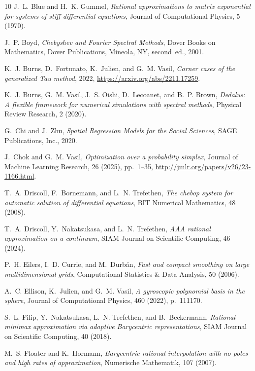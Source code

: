 \documentclass{article}
\begin{document}
\begin{thebibliography}{10}
{\sc J.~L. Blue and H.~K. Gummel}, {\em Rational approximations to matrix exponential for systems of stiff differential equations}, Journal of Computational Physics, 5 (1970).

{\sc J.~P. Boyd}, {\em Chebyshev and Fourier Spectral Methods}, Dover Books on Mathematics, Dover Publications, Mineola, NY, second~ed., 2001.

{\sc K.~J. Burns, D.~Fortunato, K.~Julien, and G.~M. Vasil}, {\em Corner cases of the generalized {T}au method}, 2022, \url{https://arxiv.org/abs/2211.17259}.

{\sc K.~J. Burns, G.~M. Vasil, J.~S. Oishi, D.~Lecoanet, and B.~P. Brown}, {\em Dedalus: A flexible framework for numerical simulations with spectral methods}, Physical Review Research, 2 (2020).

{\sc G.~Chi and J.~Zhu}, {\em Spatial Regression Models for the Social Sciences}, {SAGE} Publications, Inc., 2020.

{\sc J.~Chok and G.~M. Vasil}, {\em Optimization over a probability simplex}, Journal of Machine Learning Research, 26 (2025), pp.~1--35, \url{http://jmlr.org/papers/v26/23-1166.html}.

{\sc T.~A. Driscoll, F.~Bornemann, and L.~N. Trefethen}, {\em The chebop system for automatic solution of differential equations}, {BIT} Numerical Mathematics, 48 (2008).

{\sc T.~A. Driscoll, Y.~Nakatsukasa, and L.~N. Trefethen}, {\em {AAA} rational approximation on a continuum}, SIAM Journal on Scientific Computing, 46 (2024).

{\sc P.~H. Eilers, I.~D. Currie, and M.~Durb{\'{a}}n}, {\em Fast and compact smoothing on large multidimensional grids}, Computational Statistics \& Data Analysis, 50 (2006).

{\sc A.~C. Ellison, K.~Julien, and G.~M. Vasil}, {\em A gyroscopic polynomial basis in the sphere}, Journal of Computational Physics, 460 (2022), p.~111170.

{\sc S.~L. Filip, Y.~Nakatsukasa, L.~N. Trefethen, and B.~Beckermann}, {\em Rational minimax approximation via adaptive {B}arycentric representations}, {SIAM} Journal on Scientific Computing, 40 (2018).

{\sc M.~S. Floater and K.~Hormann}, {\em Barycentric rational interpolation with no poles and high rates of approximation}, Numerische Mathematik, 107 (2007).


\end{thebibliography}
\end{document}
